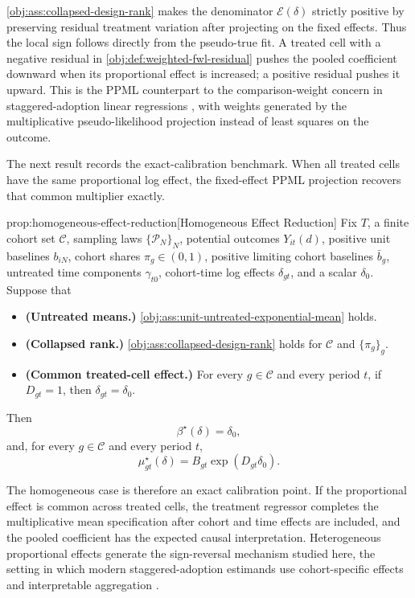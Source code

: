 \documentclass[11pt]{article}
\begin{document}
\cref{obj:ass:collapsed-design-rank} makes the denominator $\mathcal E(\delta)$ strictly positive by preserving residual treatment variation after projecting on the fixed effects. Thus the local sign follows directly from the pseudo-true fit. A treated cell with a negative residual in \cref{obj:def:weighted-fwl-residual} pushes the pooled coefficient downward when its proportional effect is increased; a positive residual pushes it upward. This is the PPML counterpart to the comparison-weight concern in staggered-adoption linear regressions \citep{GoodmanBacon2021,deChaisemartinDHaultfoeuille2020TWFE}, with weights generated by the multiplicative pseudo-likelihood projection instead of least squares on the outcome.

The next result records the exact-calibration benchmark. When all treated cells have the same proportional log effect, the fixed-effect PPML projection recovers that common multiplier exactly.

\begin{theoremv}{prop:homogeneous-effect-reduction}[Homogeneous Effect Reduction]
Fix $T$, a finite cohort set $\mathcal C$, sampling laws $\{\mathcal P_N\}_N$, potential outcomes $Y_{it}(d)$, positive unit baselines $b_{iN}$, cohort shares $\pi_g\in(0,1)$, positive limiting cohort baselines $\bar b_g$, untreated time components $\gamma_{t0}$, cohort-time log effects $\delta_{gt}$, and a scalar $\delta_0$. Suppose that
\begin{itemize}
\item \textbf{(Untreated means.)} \cref{obj:ass:unit-untreated-exponential-mean} holds.
\item \textbf{(Collapsed rank.)} \cref{obj:ass:collapsed-design-rank} holds for $\mathcal C$ and $\{\pi_g\}_g$.
\item \textbf{(Common treated-cell effect.)} For every $g\in\mathcal C$ and every period $t$, if $D_{gt}=1$, then $\delta_{gt}=\delta_0$.
\end{itemize}
Then
\[
\beta^\star(\delta)=\delta_0,
\]
and, for every $g\in\mathcal C$ and every period $t$,
\[
\mu^\star_{gt}(\delta)
=
B_{gt}\exp(D_{gt}\delta_0).
\]
\end{theoremv}

The homogeneous case is therefore an exact calibration point. If the proportional effect is common across treated cells, the treatment regressor completes the multiplicative mean specification after cohort and time effects are included, and the pooled coefficient has the expected causal interpretation. Heterogeneous proportional effects generate the sign-reversal mechanism studied here, the setting in which modern staggered-adoption estimands use cohort-specific effects and interpretable aggregation \citep{CallawaySantAnna2021,SunAbraham2021,BorusyakJaravelSpiess2024}.
\end{document}
